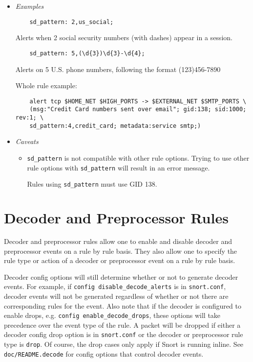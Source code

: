 \documentclass[english]{report}
\begin{document}
\begin{itemize}
\item[] \textit{Examples}
\begin{verbatim}
    sd_pattern: 2,us_social;
\end{verbatim}
    Alerts when 2 social security numbers (with dashes) appear in a session.

\begin{verbatim}
    sd_pattern: 5,(\d{3})\d{3}-\d{4};
\end{verbatim}
    Alerts on 5 U.S. phone numbers, following the format (123)456-7890

    Whole rule example:

\begin{verbatim}
    alert tcp $HOME_NET $HIGH_PORTS -> $EXTERNAL_NET $SMTP_PORTS \
    (msg:"Credit Card numbers sent over email"; gid:138; sid:1000; rev:1; \
    sd_pattern:4,credit_card; metadata:service smtp;)
\end{verbatim}


\item[] \textit{Caveats}
\begin{itemize}
\item[] \texttt{sd\_pattern} is not compatible with other rule options. Trying to use
other rule options with \texttt{sd\_pattern} will result in an error message.

Rules using \texttt{sd\_pattern} must use GID 138.
\end{itemize}
\end{itemize}

\section{Decoder and Preprocessor Rules}

Decoder and preprocessor rules allow one to enable and disable decoder and
preprocessor events on a rule by rule basis.  They also allow one to specify
the rule type or action of a decoder or preprocessor event on a rule by rule
basis.

Decoder config options will still determine whether or not to generate decoder
events.  For example, if \texttt{config disable\_decode\_alerts} is in
\texttt{snort.conf}, decoder events will not be generated regardless of whether
or not there are corresponding rules for the event.  Also note that if the
decoder is configured to enable drops, e.g. \texttt{config
enable\_decode\_drops}, these options will take precedence over the event type
of the rule.  A packet will be dropped if either a decoder config drop option
is in \texttt{snort.conf} or the decoder or preprocessor rule type is
\texttt{drop}.  Of course, the drop cases only apply if Snort is running
inline.  See \texttt{doc/README.decode} for config options that control decoder
events.
\end{document}

